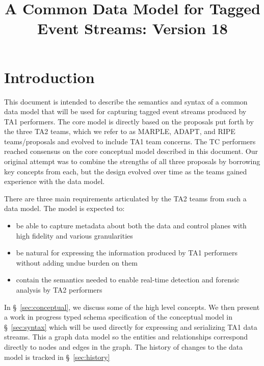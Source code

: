 \documentclass[10pt, conference, onecolumn]{IEEEtran}
\begin{document}
\title{A Common Data Model for Tagged Event Streams: Version 18}
\maketitle

\section{Introduction}

This document is intended to describe the semantics and syntax of a
common data model that will be used for capturing tagged event streams
produced by TA1 performers. The core model is directly based on the
proposals put forth by the three TA2 teams, which we refer to as
MARPLE, ADAPT, and RIPE teams/proposals and evolved to include TA1
team concerns. The TC performers reached consensus on the core
conceptual model described in this document. Our original attempt was
to combine the strengths of all three proposals by borrowing key
concepts from each, but the design evolved over time as the teams
gained experience with the data model.

There are three main requirements articulated by the
TA2 teams from such a data model. The model is expected to:

\begin{itemize}

  \item be able to capture metadata about both the data and control
    planes with high fidelity and various granularities

  \item be natural for expressing the information produced by TA1
    performers without adding undue burden on them

  \item contain the semantics needed to enable real-time detection and
    forensic analysis by TA2 performers

\end{itemize}

In \S~\ref{sec:conceptual}, we discuss some of the high level
concepts. We then present a work in progress typed schema
specification of the conceptual model in \S~\ref{sec:syntax} which
will be used directly for expressing and serializing TA1 data streams.
This a graph data model so the entities and relationships correspond
directly to nodes and edges in the graph. The history of changes to the data model is tracked in \S~\ref{sec:history}
\end{document}
